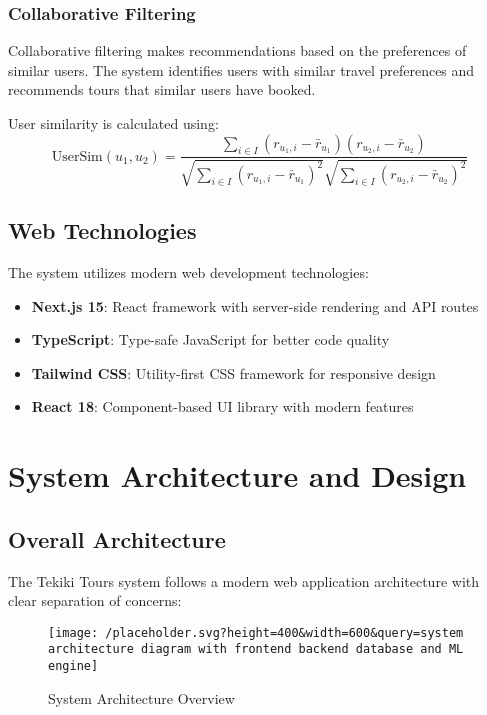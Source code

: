 \documentclass[12pt,a4paper]{article}
\begin{document}
\subsubsection{Collaborative Filtering}
Collaborative filtering makes recommendations based on the preferences of similar users. The system identifies users with similar travel preferences and recommends tours that similar users have booked.

User similarity is calculated using:
$$\text{UserSim}(u_1, u_2) = \frac{\sum_{i \in I} (r_{u_1,i} - \bar{r}_{u_1})(r_{u_2,i} - \bar{r}_{u_2})}{\sqrt{\sum_{i \in I} (r_{u_1,i} - \bar{r}_{u_1})^2} \sqrt{\sum_{i \in I} (r_{u_2,i} - \bar{r}_{u_2})^2}}$$

\subsection{Web Technologies}
The system utilizes modern web development technologies:
\begin{itemize}
    \item \textbf{Next.js 15}: React framework with server-side rendering and API routes
    \item \textbf{TypeScript}: Type-safe JavaScript for better code quality
    \item \textbf{Tailwind CSS}: Utility-first CSS framework for responsive design
    \item \textbf{React 18}: Component-based UI library with modern features
\end{itemize}

\newpage

\section{System Architecture and Design}

\subsection{Overall Architecture}
The Tekiki Tours system follows a modern web application architecture with clear separation of concerns:

\begin{figure}[H]
    \centering
    \texttt{[image: /placeholder.svg?height=400\&width=600\&query=system architecture diagram with frontend backend database and ML engine]}
    \caption{System Architecture Overview}
    \label{fig:architecture}
\end{figure}
\end{document}
